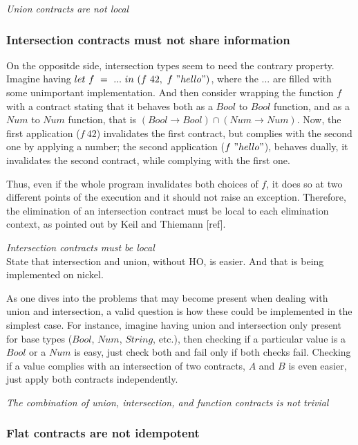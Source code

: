 \textit{Union contracts are not local}

\subsubsection*{Intersection contracts must not share information}

On the oppositde side, intersection types seem to need the contrary property.
Imagine having $let~f~=~...~in~(f~42,~f~"hello")$, where the $...$ are filled
with some unimportant implementation. And then consider wrapping the function
$f$ with a contract stating that it behaves both as a $Bool$ to $Bool$ function,
and as a $Num$ to $Num$ function, that is $(Bool \rightarrow Bool) \cap (Num \rightarrow Num)$.
Now, the first application ($f~42$) invalidates the first contract, but complies with the second
one by applying a number; the second application ($f~"hello"$), behaves dually,
it invalidates the second contract,
while complying with the first one.

Thus, even if the whole program invalidates both choices of $f$, it does
so at two different points of the execution and it should not raise an exception.
Therefore, the elimination of an intersection contract must be local to each elimination
context, as pointed out by Keil and Thiemann [ref].

\textit{Intersection contracts must be local}\\

State that intersection and union, without HO, is easier. And that is being implemented on nickel.

As one dives into the problems that may become present when dealing with union and intersection,
a valid question is how these could be implemented in the simplest case. For instance, imagine having
union and intersection only present for base types ($Bool$, $Num$, $String$, etc.), then checking
if a particular value is a $Bool$ or a $Num$ is easy, just check both and fail only if both 
checks fail. Checking if a value complies with an intersection of two contracts, $A$ and $B$ is even
easier, just apply both contracts independently.

\textit{The combination of union, intersection, and function contracts is not trivial}

\subsubsection*{Flat contracts are not idempotent}

